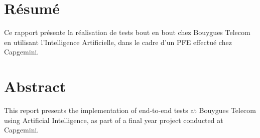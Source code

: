 \chapter*{Résumé}

Ce rapport présente la réalisation de tests bout en bout chez Bouygues Telecom en utilisant l'Intelligence Artificielle, dans le cadre d'un PFE effectué chez Capgemini.

\chapter*{Abstract}

This report presents the implementation of end-to-end tests at Bouygues Telecom using Artificial Intelligence, as part of a final year project conducted at Capgemini.

\newpage
